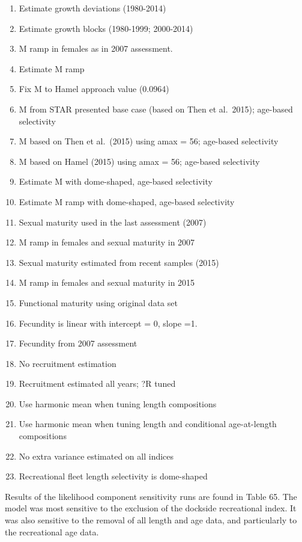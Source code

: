 \documentclass[11pt,
  english,
  letterpaper,
]{article}
\providecommand{\tightlist}{%
  \setlength{\itemsep}{0pt}\setlength{\parskip}{0pt}}
\providecommand{\tightlist}{%
  \setlength{\itemsep}{0pt}\setlength{\parskip}{0pt}}
\begin{document}
\begin{enumerate}
\def\labelenumi{\arabic{enumi}.}
\tightlist
\item
  Estimate growth deviations (1980-2014)
\item
  Estimate growth blocks (1980-1999; 2000-2014)
\item
  M ramp in females as in 2007 assessment.
\item
  Estimate M ramp
\item
  Fix M to Hamel approach value (0.0964)
\item
  M from STAR presented base case (based on Then et al.~2015); age-based selectivity
\item
  M based on Then et al.~(2015) using amax = 56; age-based selectivity
\item
  M based on Hamel (2015) using amax = 56; age-based selectivity
\item
  Estimate M with dome-shaped, age-based selectivity
\item
  Estimate M ramp with dome-shaped, age-based selectivity
\item
  Sexual maturity used in the last assessment (2007)
\item
  M ramp in females and sexual maturity in 2007
\item
  Sexual maturity estimated from recent samples (2015)
\item
  M ramp in females and sexual maturity in 2015
\item
  Functional maturity using original data set
\item
  Fecundity is linear with intercept = 0, slope =1.
\item
  Fecundity from 2007 assessment
\item
  No recruitment estimation
\item
  Recruitment estimated all years; ?R tuned
\item
  Use harmonic mean when tuning length compositions
\item
  Use harmonic mean when tuning length and conditional age-at-length compositions
\item
  No extra variance estimated on all indices
\item
  Recreational fleet length selectivity is dome-shaped
\end{enumerate}

Results of the likelihood component sensitivity runs are found in Table 65. The model was most sensitive to the exclusion of the dockside recreational index. It was also sensitive to the removal of all length and age data, and particularly to the recreational age data.
\end{document}
